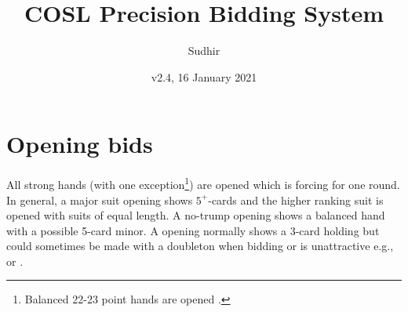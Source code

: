 \documentclass[a4paper,article,oneside]{memoir}
\begin{document}
\title{COSL Precision Bidding System}
\author{Sudhir}
\date{v2.4, 16 January 2021}
\maketitle

\tableofcontents

\pagebreak

\section{Opening bids}

All strong hands (with one exception\footnote{Balanced 22-23
  point hands are opened .}) are opened  which is forcing
for one round. In general, a major suit opening shows $5^+$-cards and
the higher ranking suit is opened with suits of equal length. A
no-trump opening shows a balanced hand with a possible 5-card minor. A
 opening normally shows a 3-card holding but could sometimes be
made with a doubleton when bidding  or  is unattractive
e.g.,  or .
\end{document}
